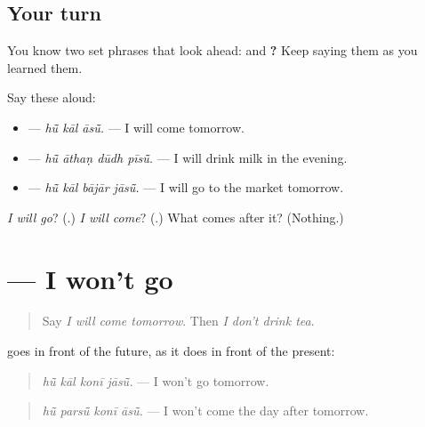 \subsection*{Your turn}
You know two set phrases that look ahead: \textbf{ } and \textbf{   ?} Keep saying them as you learned them.

Say these aloud:

\begin{itemize}
\raggedright
  \item \textbf{  } — \emph{hū̃ kāl āsū̃.} — I will come tomorrow.
  \item \textbf{   } — \emph{hū̃ āthaṇ dūdh pīsū̃.} — I will drink milk in the evening.
  \item \textbf{   } — \emph{hū̃ kāl bājār jāsū̃.} — I will go to the market tomorrow.
\end{itemize}

\begin{tcolorbox}[breakable,colback=teal!4,colframe=teal!35!black,title={Before you move on}]
\emph{I will go}? (\textbf{}.) \emph{I will come}? (\textbf{}.) What comes after it? (Nothing.)
\end{tcolorbox}
\section[\texorpdfstring{\mw{कोनी} \mw{जासूं} (konī jāsū̃)}{कोनी जासूं (konī jāsū̃)}]{    — I won't go}

\label{lesson:MW-C162-koni-jasu}



\begin{quote}
Say \emph{I will come tomorrow}. Then \emph{I don't drink tea}.
\end{quote}

\begin{grammarlens}[title={Grammar Lens: \mw{कोनी} before the future}]
\textbf{} goes in front of the future, as it does in front of the present:

\begin{quote}
\textbf{   }
\end{quote}

\begin{quote}
\emph{hū̃ kāl konī jāsū̃.} — I won't go tomorrow.
\end{quote}

\begin{quote}
\textbf{   }
\end{quote}

\begin{quote}
\emph{hū̃ parsū̃ konī āsū̃.} — I won't come the day after tomorrow.
\end{quote}
\end{grammarlens}

